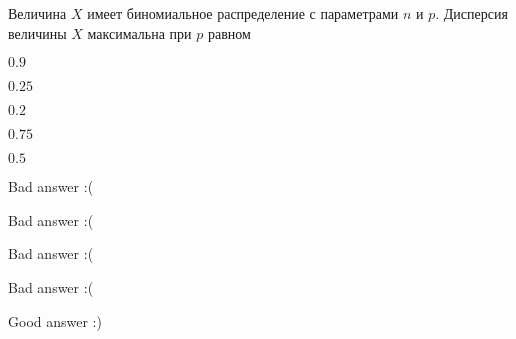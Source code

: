 
\begin{question}
Величина \(X\) имеет биномиальное распределение с параметрами \(n\) и
\(p\). Дисперсия величины \(X\) максимальна при \(p\) равном
\begin{answerlist}
  \item \(0.9\)
  \item \(0.25\)
  \item \(0.2\)
  \item \(0.75\)
  \item \(0.5\)
\end{answerlist}
\end{question}

\begin{solution}
\begin{answerlist}
  \item Bad answer :(
  \item Bad answer :(
  \item Bad answer :(
  \item Bad answer :(
  \item Good answer :)
\end{answerlist}
\end{solution}

